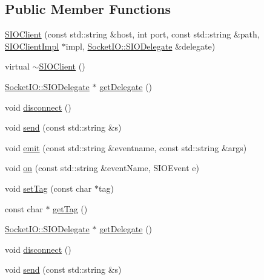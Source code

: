 \subsection*{Public Member Functions}
\begin{DoxyCompactItemize}
\item 
\hyperlink{classnetwork_1_1SIOClient_a21140a7daced6d272691187aba28fddf}{S\+I\+O\+Client} (const std\+::string \&host, int port, const std\+::string \&path, \hyperlink{classnetwork_1_1SIOClientImpl}{S\+I\+O\+Client\+Impl} $\ast$impl, \hyperlink{classnetwork_1_1SocketIO_1_1SIODelegate}{Socket\+I\+O\+::\+S\+I\+O\+Delegate} \&delegate)
\item 
virtual \hyperlink{classnetwork_1_1SIOClient_ae9599bf5c7057f10a3eaff37d1b39274}{$\sim$\+S\+I\+O\+Client} ()
\item 
\hyperlink{classnetwork_1_1SocketIO_1_1SIODelegate}{Socket\+I\+O\+::\+S\+I\+O\+Delegate} $\ast$ \hyperlink{classnetwork_1_1SIOClient_a0129a31808dc90c1423f5b991e0fb9ad}{get\+Delegate} ()
\item 
void \hyperlink{classnetwork_1_1SIOClient_a6c4188b812cef24b1aa9c31bb44f2cae}{disconnect} ()
\item 
void \hyperlink{classnetwork_1_1SIOClient_a868d719567a33b92475ee1baddc10648}{send} (const std\+::string \&s)
\item 
void \hyperlink{classnetwork_1_1SIOClient_a6467c540e8efb9c2f291746f0e0b7ab9}{emit} (const std\+::string \&eventname, const std\+::string \&args)
\item 
void \hyperlink{classnetwork_1_1SIOClient_af598d6039c7de3a591e628f754a38d9e}{on} (const std\+::string \&event\+Name, S\+I\+O\+Event e)
\item 
void \hyperlink{classnetwork_1_1SIOClient_a61511bcf1cfb9cd450ac7babd650c441}{set\+Tag} (const char $\ast$tag)
\item 
const char $\ast$ \hyperlink{classnetwork_1_1SIOClient_a4a3c602ea681844be68e158a95a0e75d}{get\+Tag} ()
\item 
\hyperlink{classnetwork_1_1SocketIO_1_1SIODelegate}{Socket\+I\+O\+::\+S\+I\+O\+Delegate} $\ast$ \hyperlink{classnetwork_1_1SIOClient_a0129a31808dc90c1423f5b991e0fb9ad}{get\+Delegate} ()
\item 
void \hyperlink{classnetwork_1_1SIOClient_a6c4188b812cef24b1aa9c31bb44f2cae}{disconnect} ()
\item 
void \hyperlink{classnetwork_1_1SIOClient_a868d719567a33b92475ee1baddc10648}{send} (const std\+::string \&s)
\item 
\mbox{\label{classnetwork_1_1SIOClient_ad5da425464d1155b8f8fbc63ca622278}} 

\end{DoxyCompactItemize}
